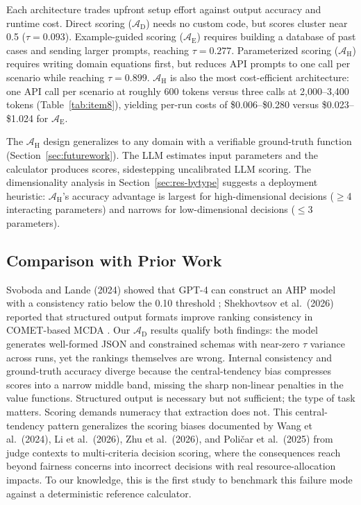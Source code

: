 \documentclass[final,3p,times]{elsarticle}
\begin{document}
Each architecture trades upfront setup effort against output accuracy and runtime cost. Direct scoring ($\mathcal{A}_{\text{D}}$) needs no custom code, but scores cluster near 0.5 ($\tau = 0.093$). Example-guided scoring ($\mathcal{A}_{\text{E}}$) requires building a database of past cases and sending larger prompts, reaching $\tau = 0.277$. Parameterized scoring ($\mathcal{A}_{\text{H}}$) requires writing domain equations first, but reduces API prompts to one call per scenario while reaching $\tau = 0.899$. $\mathcal{A}_{\text{H}}$ is also the most cost-efficient architecture: one API call per scenario at roughly 600 tokens versus three calls at 2,000--3,400 tokens (Table~\ref{tab:item8}), yielding per-run costs of \$0.006--\$0.280 versus \$0.023--\$1.024 for $\mathcal{A}_{\text{E}}$.

The $\mathcal{A}_{\text{H}}$ design generalizes to any domain with a verifiable ground-truth function (Section~\ref{sec:futurework}). The LLM estimates input parameters and the calculator produces scores, sidestepping uncalibrated LLM scoring. The dimensionality analysis in Section~\ref{sec:res-bytype} suggests a deployment heuristic: $\mathcal{A}_{\text{H}}$'s accuracy advantage is largest for high-dimensional decisions ($\geq$4 interacting parameters) and narrows for low-dimensional decisions ($\leq$3 parameters).

\subsection{Comparison with Prior Work}
\label{sec:comparison}

Svoboda and Lande (2024) showed that GPT-4 can construct an AHP model with a consistency ratio below the 0.10 threshold \cite{svoboda2024}; Shekhovtsov et al.\ (2026) reported that structured output formats improve ranking consistency in COMET-based MCDA \cite{icaart26}. Our $\mathcal{A}_{\text{D}}$ results qualify both findings: the model generates well-formed JSON and constrained schemas with near-zero $\tau$ variance across runs, yet the rankings themselves are wrong. Internal consistency and ground-truth accuracy diverge because the central-tendency bias compresses scores into a narrow middle band, missing the sharp non-linear penalties in the value functions. Structured output is necessary but not sufficient; the type of task matters. Scoring demands numeracy that extraction does not. This central-tendency pattern generalizes the scoring biases documented by Wang et al.\ (2024), Li et al.\ (2026), Zhu et al.\ (2026), and Poličar et al.\ (2025) from judge contexts to multi-criteria decision scoring, where the consequences reach beyond fairness concerns into incorrect decisions with real resource-allocation impacts. To our knowledge, this is the first study to benchmark this failure mode against a deterministic reference calculator.
\end{document}
